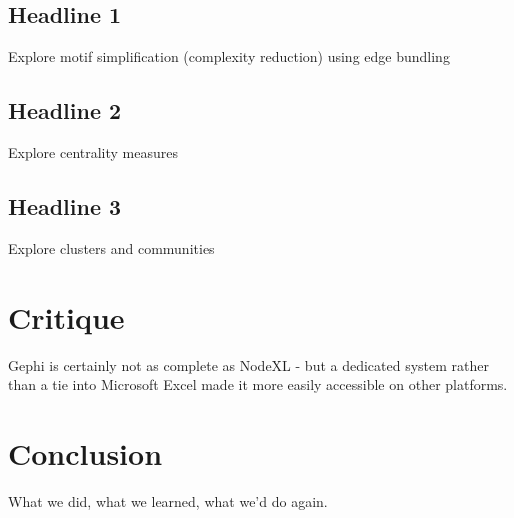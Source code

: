 \documentclass[11pt,letterpaper]{article}
\begin{document}
\subsection*{Headline 1}

Explore motif simplification (complexity reduction) using edge bundling

\subsection*{Headline 2}

Explore centrality measures


\subsection*{Headline 3}

Explore clusters and communities

\section*{Critique}

Gephi is certainly not as complete as NodeXL - but a dedicated system rather than a tie into Microsoft Excel made it more easily accessible on other platforms.

\section*{Conclusion}

What we did, what we learned, what we'd do again. 



\end{document}
